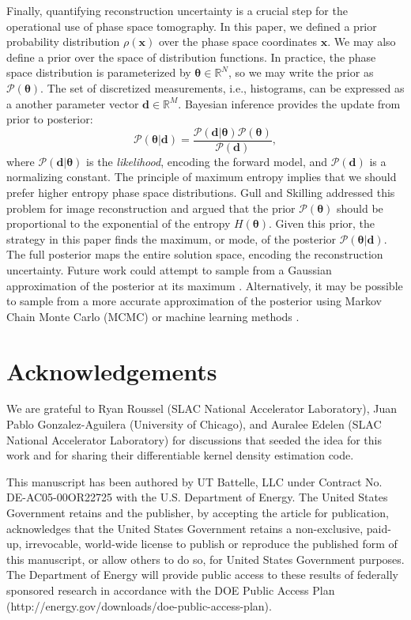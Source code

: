 \documentclass[%
    reprint,
    twocolumn,
    nofootinbib,
    amsmath,
    amssymb,
    aps,
    prstab,
]{revtex4-2}
\newcommand{\vect}[1]{\boldsymbol{\mathbf{#1}}}
\begin{document}
Finally, quantifying reconstruction uncertainty is a crucial step for the operational use of phase space tomography. In this paper, we defined a prior probability distribution $\rho(\vect{x})$ over the phase space coordinates $\vect{x}$. We may also define a prior over the space of distribution functions. In practice, the phase space distribution is parameterized by $\vect{\theta} \in \mathbb{R}^N$, so we may write the prior as $\mathcal{P}(\vect{\theta})$. The set of discretized measurements, i.e., histograms, can be expressed as a another parameter vector $\vect{d} \in \mathbb{R}^M$. Bayesian inference provides the update from prior to posterior:
%
\begin{equation}\label{eq:bayesian}
    \mathcal{P}(\vect{\theta} | \vect{d}) =
    \frac
    {
        \mathcal{P}(\vect{d} | \vect{\theta}) 
        \mathcal{P}(\vect{\theta}) 
    }
    {
        \mathcal{P}(\vect{d})
    },
\end{equation}
%
where $\mathcal{P}(\vect{d} | \vect{\theta})$ is the \textit{likelihood}, encoding the forward model, and $\mathcal{P}(\vect{d})$ is a normalizing constant. The principle of maximum entropy implies that we should prefer higher entropy phase space distributions. Gull and Skilling \cite{Skilling_1991} addressed this problem for image reconstruction and argued that the prior $\mathcal{P}(\vect{\theta})$ should be proportional to the exponential of the entropy $H(\vect{\theta})$. Given this prior, the strategy in this paper finds the maximum, or mode, of the posterior $\mathcal{P}(\vect{\theta} | \vect{d})$. The full posterior maps the entire solution space, encoding the reconstruction uncertainty. Future work could attempt to sample from a Gaussian approximation of the posterior at its maximum \cite{Skilling_1991}. Alternatively, it may be possible to sample from a more accurate approximation of the posterior using Markov Chain Monte Carlo (MCMC) or machine learning methods \cite{Mardani_2023}.


\section{Acknowledgements}

We are grateful to Ryan Roussel (SLAC National Accelerator Laboratory), Juan Pablo Gonzalez-Aguilera (University of Chicago), and Auralee Edelen (SLAC National Accelerator Laboratory) for discussions that seeded the idea for this work and for sharing their differentiable kernel density estimation code.

This manuscript has been authored by UT Battelle, LLC under Contract No. DE-AC05-00OR22725 with the U.S. Department of Energy. The United States Government retains and the publisher, by accepting the article for publication, acknowledges that the United States Government retains a non-exclusive, paid-up, irrevocable, world-wide license to publish or reproduce the published form of this manuscript, or allow others to do so, for United States Government purposes. The Department of Energy will provide public access to these results of federally sponsored research in accordance with the DOE Public Access Plan (http://energy.gov/downloads/doe-public-access-plan).




\end{document}
